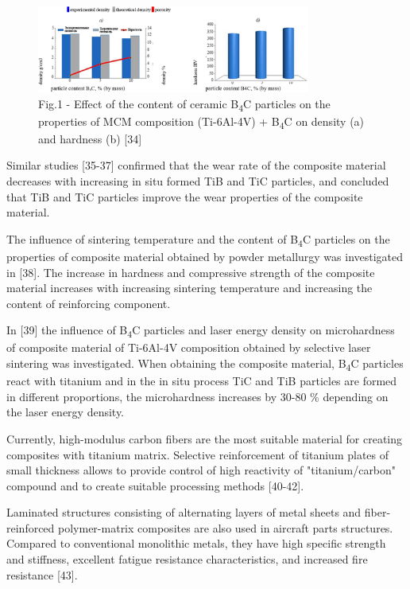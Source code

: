 \begin{figure}[H]
	\centering
	\includegraphics[width=0.8\textwidth]{media/chem4/image11}
	\caption*{Fig.1 - Effect of the content of ceramic B\textsubscript{4}C particles on the properties of MCM composition (Ti-6Al-4V) + B\textsubscript{4}C on density (a) and hardness (b) {[}34{]}}
\end{figure}

\begin{multicols}{2}
Similar studies {[}35-37{]} confirmed that the wear rate of the
composite material decreases with increasing in situ formed TiB and TiC
particles, and concluded that TiB and TiC particles improve the wear
properties of the composite material.

The influence of sintering temperature and the content of
B\textsubscript{4}C particles on the properties of composite material
obtained by powder metallurgy was investigated in {[}38{]}. The increase
in hardness and compressive strength of the composite material increases
with increasing sintering temperature and increasing the content of
reinforcing component.

In {[}39{]} the influence of B\textsubscript{4}C particles and laser
energy density on microhardness of composite material of Ti-6Al-4V
composition obtained by selective laser sintering was investigated. When
obtaining the composite material, B\textsubscript{4}C particles react
with titanium and in the in situ process TiC and TiB particles are
formed in different proportions, the microhardness increases by 30-80 \%
depending on the laser energy density.

Currently, high-modulus carbon fibers are the most suitable material for
creating composites with titanium matrix. Selective reinforcement of
titanium plates of small thickness allows to provide control of high
reactivity of "titanium/carbon" compound and to create suitable
processing methods {[}40-42{]}.

Laminated structures consisting of alternating layers of metal sheets
and fiber-reinforced polymer-matrix composites are also used in aircraft
parts structures. Compared to conventional monolithic metals, they have
high specific strength and stiffness, excellent fatigue resistance
characteristics, and increased fire resistance {[}43{]}.


\end{multicols}
